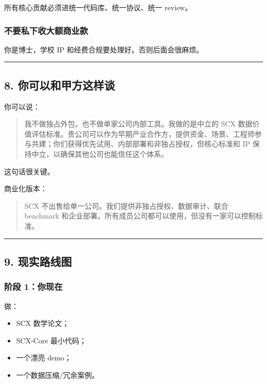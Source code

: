 \documentclass[
  12pt,
]{ctexart}
\providecommand{\tightlist}{%
  \setlength{\itemsep}{0pt}\setlength{\parskip}{0pt}}
\begin{document}
所有核心贡献必须进统一代码库、统一协议、统一 review。

\subsubsection{不要私下收大额商业款}\label{ux4e0dux8981ux79c1ux4e0bux6536ux5927ux989dux5546ux4e1aux6b3e}

你是博士，学校 IP 和经费合规要处理好。否则后面会很麻烦。

\begin{center}\rule{0.5\linewidth}{0.5pt}\end{center}

\subsection{8.
你可以和甲方这样谈}\label{ux4f60ux53efux4ee5ux548cux7532ux65b9ux8fd9ux6837ux8c08}

你可以说：

\begin{quote}
我不做独占外包，也不做单家公司内部工具。我做的是中立的 SCX
数据价值评估标准。贵公司可以作为早期产业合作方，提供资金、场景、工程师参与共建；你们获得优先试用、内部部署和非独占授权，但核心标准和
IP 保持中立，以确保其他公司也能信任这个体系。
\end{quote}

这句话很关键。

商业化版本：

\begin{quote}
SCX 不出售给单一公司。我们提供非独占授权、数据审计、联合 benchmark
和企业部署。所有成员公司都可以使用，但没有一家可以控制标准。
\end{quote}

\begin{center}\rule{0.5\linewidth}{0.5pt}\end{center}

\subsection{9. 现实路线图}\label{ux73b0ux5b9eux8defux7ebfux56fe}

\subsubsection{阶段 1：你现在}\label{ux9636ux6bb5-1ux4f60ux73b0ux5728}

做：

\begin{itemize}
\tightlist
\item
  SCX 数学论文；
\item
  SCX-Core 最小代码；
\item
  一个漂亮 demo；
\item
  一个数据压缩/冗余案例。
\end{itemize}
\end{document}
